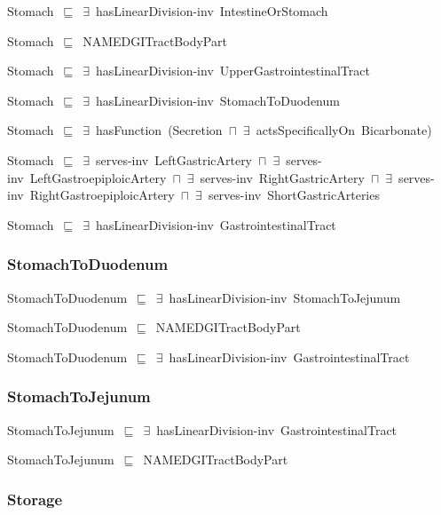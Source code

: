 \documentclass{article}
\begin{document}
Stomach~\ensuremath{\sqsubseteq}~\ensuremath{\exists}~hasLinearDivision-inv~IntestineOrStomach~

Stomach~\ensuremath{\sqsubseteq}~NAMEDGITractBodyPart~

Stomach~\ensuremath{\sqsubseteq}~\ensuremath{\exists}~hasLinearDivision-inv~UpperGastrointestinalTract~

Stomach~\ensuremath{\sqsubseteq}~\ensuremath{\exists}~hasLinearDivision-inv~StomachToDuodenum~

Stomach~\ensuremath{\sqsubseteq}~\ensuremath{\exists}~hasFunction~(Secretion~\ensuremath{\sqcap}~\ensuremath{\exists}~actsSpecificallyOn~Bicarbonate)~

Stomach~\ensuremath{\sqsubseteq}~\ensuremath{\exists}~serves-inv~LeftGastricArtery~\ensuremath{\sqcap}~\ensuremath{\exists}~serves-inv~LeftGastroepiploicArtery~\ensuremath{\sqcap}~\ensuremath{\exists}~serves-inv~RightGastricArtery~\ensuremath{\sqcap}~\ensuremath{\exists}~serves-inv~RightGastroepiploicArtery~\ensuremath{\sqcap}~\ensuremath{\exists}~serves-inv~ShortGastricArteries~

Stomach~\ensuremath{\sqsubseteq}~\ensuremath{\exists}~hasLinearDivision-inv~GastrointestinalTract~

\subsubsection*{StomachToDuodenum}

StomachToDuodenum~\ensuremath{\sqsubseteq}~\ensuremath{\exists}~hasLinearDivision-inv~StomachToJejunum~

StomachToDuodenum~\ensuremath{\sqsubseteq}~NAMEDGITractBodyPart~

StomachToDuodenum~\ensuremath{\sqsubseteq}~\ensuremath{\exists}~hasLinearDivision-inv~GastrointestinalTract~

\subsubsection*{StomachToJejunum}

StomachToJejunum~\ensuremath{\sqsubseteq}~\ensuremath{\exists}~hasLinearDivision-inv~GastrointestinalTract~

StomachToJejunum~\ensuremath{\sqsubseteq}~NAMEDGITractBodyPart~

\subsubsection*{Storage}
\end{document}
